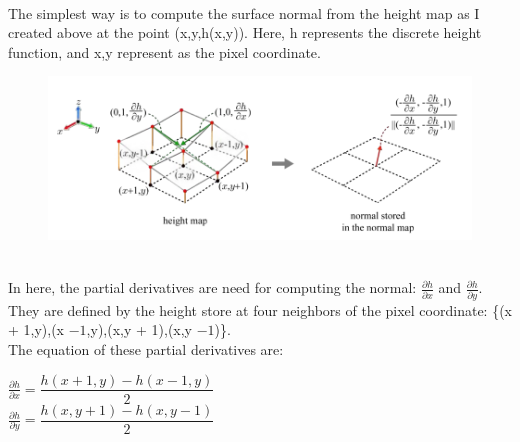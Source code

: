 \documentclass[a4paper, 13pt]{extarticle}
\begin{document}
 \\[0.01cm]
 The simplest way is to compute the surface normal from the height map as I created above at the point  (x,y,h(x,y)). Here, h represents the discrete height function, and x,y represent as the pixel coordinate. 
 \begin{figure}[h]
 	\begin{minipage}{1\textwidth}
 		\centering
 		\includegraphics[width=0.8\linewidth]{intructions/normal_map_calculation.png}
 		\centering
 	\end{minipage}
 \end{figure} 
\\[0.01cm]
In here, the partial derivatives are need for computing the normal: $\frac{\partial h}{\partial x}$ and $\frac{\partial h}{\partial y}$. They are defined by the height store at four neighbors of the pixel coordinate: \{(x + 1,y),(x $- 1$,y),(x,y + 1),(x,y $- 1$)\}. \\[0.01cm]The equation of these partial derivatives are: \begin{minipage}{1\textwidth}
	\scalebox{1.3} {$\frac{\partial h}{\partial x} = \dfrac{h(x + 1,y) - h(x - 1,y)}{2}$ }
	\\[0.04cm]
	\scalebox{1.3} {$\frac{\partial h}{\partial y} = \dfrac{h(x,y + 1) - h(x,y - 1)}{2}$ }
\end{minipage}
\end{document}
